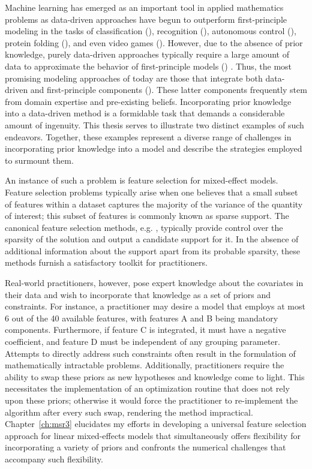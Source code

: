 Machine learning has emerged as an important tool in applied mathematics problems as data-driven approaches have begun to outperform  first-principle modeling in the tasks of classification (\cite{lecun1999object}), recognition (\cite{deng2009imagenet,shafiq2022deep}),  autonomous control (\cite{janai2020computer}), protein folding (\cite{jumper2021highly}), and even video games (\cite{chen2016evolution}). However, due to the absence of prior knowledge,  purely data-driven approaches typically require a large amount of data to approximate the behavior of first-principle models (\cite{kutz2013data,pan2018long}) . Thus, the most promising modeling approaches of today are those that integrate both data-driven and first-principle components (\cite{rackauckas2020udes,raissi2019physics}). These latter components frequently stem from domain expertise and pre-existing beliefs. Incorporating prior knowledge into a data-driven method is a formidable task that demands a considerable amount of ingenuity. This thesis serves to illustrate two distinct examples of such endeavors.  Together, these examples represent a diverse range of challenges in incorporating prior knowledge into a model and describe the strategies employed to surmount them.

An instance of such a problem is feature selection for mixed-effect models. Feature selection problems typically arise when one believes that a small subset of features within a dataset captures the majority of the variance of the quantity of interest; this subset of features is commonly known as sparse support. The canonical feature selection methods, e.g. \cite{ibrahim2011fixed,Fan2012}, typically provide control over the  sparsity of the solution and output a candidate support for it. In the absence of additional information about the support apart from its probable sparsity, these methods furnish a satisfactory toolkit for practitioners.

 Real-world practitioners, however, pose expert knowledge about the covariates in their data and wish to incorporate that knowledge as a set of priors and constraints. For instance, a practitioner may desire a model that employs at most 6 out of the 40 available features, with features A and B being mandatory components. Furthermore, if feature C is integrated, it must have a negative coefficient, and feature D must be independent of any grouping parameter. Attempts to directly address such constraints often result in the formulation of mathematically intractable problems. Additionally, practitioners require the ability to swap these priors as new hypotheses and knowledge come to light. This necessitates the implementation of an optimization routine that does not rely upon these priors; otherwise it would force the practitioner to re-implement the algorithm after every such swap, rendering the method impractical. Chapter~\ref{ch:msr3} elucidates my efforts in developing a universal feature selection approach for linear mixed-effects models that simultaneously offers flexibility for incorporating a variety of priors and confronts the numerical challenges that accompany such flexibility.

